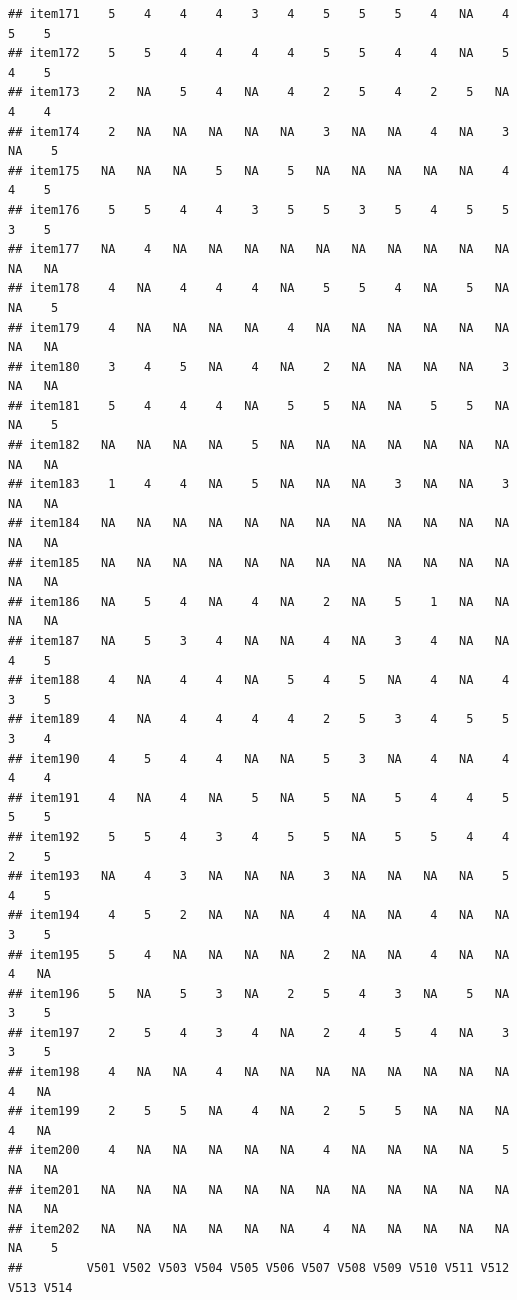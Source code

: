 \documentclass[
  man]{apa6}
\begin{document}
\begin{verbatim}
## item171    5    4    4    4    3    4    5    5    5    4   NA    4    5    5
## item172    5    5    4    4    4    4    5    5    4    4   NA    5    4    5
## item173    2   NA    5    4   NA    4    2    5    4    2    5   NA    4    4
## item174    2   NA   NA   NA   NA   NA    3   NA   NA    4   NA    3   NA    5
## item175   NA   NA   NA    5   NA    5   NA   NA   NA   NA   NA    4    4    5
## item176    5    5    4    4    3    5    5    3    5    4    5    5    3    5
## item177   NA    4   NA   NA   NA   NA   NA   NA   NA   NA   NA   NA   NA   NA
## item178    4   NA    4    4    4   NA    5    5    4   NA    5   NA   NA    5
## item179    4   NA   NA   NA   NA    4   NA   NA   NA   NA   NA   NA   NA   NA
## item180    3    4    5   NA    4   NA    2   NA   NA   NA   NA    3   NA   NA
## item181    5    4    4    4   NA    5    5   NA   NA    5    5   NA   NA    5
## item182   NA   NA   NA   NA    5   NA   NA   NA   NA   NA   NA   NA   NA   NA
## item183    1    4    4   NA    5   NA   NA   NA    3   NA   NA    3   NA   NA
## item184   NA   NA   NA   NA   NA   NA   NA   NA   NA   NA   NA   NA   NA   NA
## item185   NA   NA   NA   NA   NA   NA   NA   NA   NA   NA   NA   NA   NA   NA
## item186   NA    5    4   NA    4   NA    2   NA    5    1   NA   NA   NA   NA
## item187   NA    5    3    4   NA   NA    4   NA    3    4   NA   NA    4    5
## item188    4   NA    4    4   NA    5    4    5   NA    4   NA    4    3    5
## item189    4   NA    4    4    4    4    2    5    3    4    5    5    3    4
## item190    4    5    4    4   NA   NA    5    3   NA    4   NA    4    4    4
## item191    4   NA    4   NA    5   NA    5   NA    5    4    4    5    5    5
## item192    5    5    4    3    4    5    5   NA    5    5    4    4    2    5
## item193   NA    4    3   NA   NA   NA    3   NA   NA   NA   NA    5    4    5
## item194    4    5    2   NA   NA   NA    4   NA   NA    4   NA   NA    3    5
## item195    5    4   NA   NA   NA   NA    2   NA   NA    4   NA   NA    4   NA
## item196    5   NA    5    3   NA    2    5    4    3   NA    5   NA    3    5
## item197    2    5    4    3    4   NA    2    4    5    4   NA    3    3    5
## item198    4   NA   NA    4   NA   NA   NA   NA   NA   NA   NA   NA    4   NA
## item199    2    5    5   NA    4   NA    2    5    5   NA   NA   NA    4   NA
## item200    4   NA   NA   NA   NA   NA    4   NA   NA   NA   NA    5   NA   NA
## item201   NA   NA   NA   NA   NA   NA   NA   NA   NA   NA   NA   NA   NA   NA
## item202   NA   NA   NA   NA   NA   NA    4   NA   NA   NA   NA   NA   NA    5
##         V501 V502 V503 V504 V505 V506 V507 V508 V509 V510 V511 V512 V513 V514

\end{verbatim}
\end{document}
